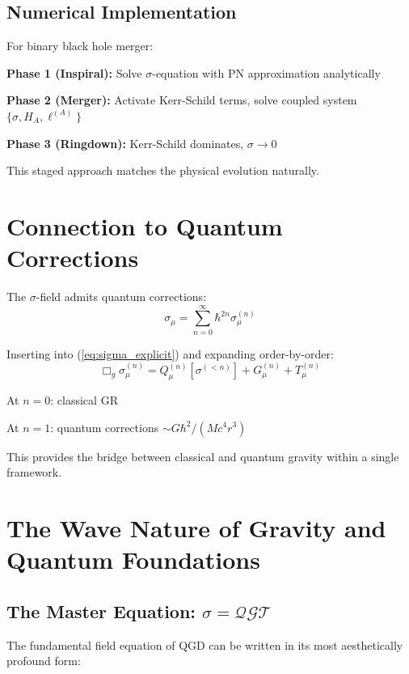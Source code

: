 \documentclass[11pt,a4paper]{article}
\theoremstyle{definition}
\theoremstyle{remark}
\begin{document}
		\subsection{Numerical Implementation}
		
		For binary black hole merger:
		
		\textbf{Phase 1 (Inspiral):} Solve $\sigma$-equation with PN approximation analytically
		
		\textbf{Phase 2 (Merger):} Activate Kerr-Schild terms, solve coupled system $\{\sigma, H_A, \ell^{(A)}\}$
		
		\textbf{Phase 3 (Ringdown):} Kerr-Schild dominates, $\sigma \to 0$
		
		This staged approach matches the physical evolution naturally.
		
		\section{Connection to Quantum Corrections}
		
		The $\sigma$-field admits quantum corrections:
		\begin{equation}
			\sigma_\mu = \sum_{n=0}^\infty \hbar^{2n}\sigma_\mu^{(n)}
		\end{equation}
		
		Inserting into (\ref{eq:sigma_explicit}) and expanding order-by-order:
		\begin{equation}
			\Box_g\sigma_\mu^{(n)} = Q_\mu^{(n)}[\sigma^{(<n)}] + G_\mu^{(n)} + T_\mu^{(n)}
		\end{equation}
		
		At $n=0$: classical GR
		
		At $n=1$: quantum corrections $\sim G\hbar^2/(Mc^4r^3)$
		
		This provides the bridge between classical and quantum gravity within a single framework.
		
		\section{The Wave Nature of Gravity and Quantum Foundations}
		
		\subsection{The Master Equation: $\sigma = \mathcal{Q}\mathcal{G}\mathcal{T}$}
		
		The fundamental field equation of QGD can be written in its most aesthetically profound form:
		
\end{document}
